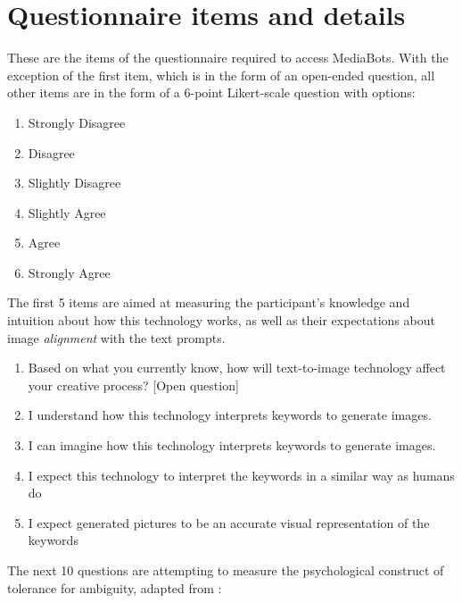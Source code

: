 \chapter{Questionnaire items and details}
\label{AppendixB}

These are the items of the questionnaire required to access MediaBots. With the exception of the first item, which is in the form of an open-ended question, all other items are in the form of a 6-point Likert-scale question with options:

\begin{enumerate}
\item Strongly Disagree
\item Disagree
\item Slightly Disagree
\item Slightly Agree
\item Agree
\item Strongly Agree
\end{enumerate}

The first 5 items are aimed at measuring the participant's knowledge and intuition about how this technology works, as well as their expectations about image \emph{alignment} with the text prompts.  

\begin{enumerate}
\item Based on what you currently know, how will text-to-image technology affect your creative process? [Open question]
\item I understand how this technology interprets keywords to generate images.
\item I can imagine how this technology interprets keywords to generate images.
\item I expect this technology to interpret the keywords in a similar way as humans do
\item I expect generated pictures to be an accurate visual representation of the keywords
\end{enumerate}

The next 10 questions are attempting to measure the psychological construct of tolerance for ambiguity, adapted from \cite{Herman2010}:

